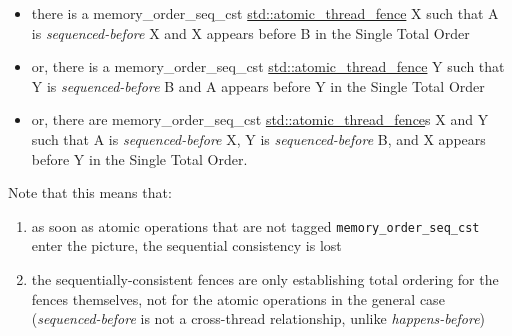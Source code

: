 \documentclass[a4paper,12pt,notitlepage,twoside,openright]{article}
\begin{document}
\begin{oframed}
\begin{itemize}
\item
  there is a memory\_order\_seq\_cst
  \href{https://en.cppreference.com/w/cpp/atomic/atomic_thread_fence}{std::atomic\_thread\_fence}
  X such that A is \emph{sequenced-before} X and X appears before B in
  the Single Total Order
\item
  or, there is a memory\_order\_seq\_cst
  \href{https://en.cppreference.com/w/cpp/atomic/atomic_thread_fence}{std::atomic\_thread\_fence}
  Y such that Y is \emph{sequenced-before} B and A appears before Y in
  the Single Total Order
\item
  or, there are memory\_order\_seq\_cst
  \href{https://en.cppreference.com/w/cpp/atomic/atomic_thread_fence}{std::atomic\_thread\_fence}s
  X and Y such that A is \emph{sequenced-before} X, Y is
  \emph{sequenced-before} B, and X appears before Y in the Single Total
  Order.
\end{itemize}

Note that this means that:

\begin{enumerate}

\item
  as soon as atomic operations that are not tagged
  \texttt{memory\_order\_seq\_cst} enter the picture, the sequential consistency
  is lost
\item
  the sequentially-consistent fences are only establishing total
  ordering for the fences themselves, not for the atomic operations in
  the general case (\emph{sequenced-before} is not a cross-thread
  relationship, unlike \emph{happens-before})
\end{enumerate}
\end{oframed}
\end{document}
